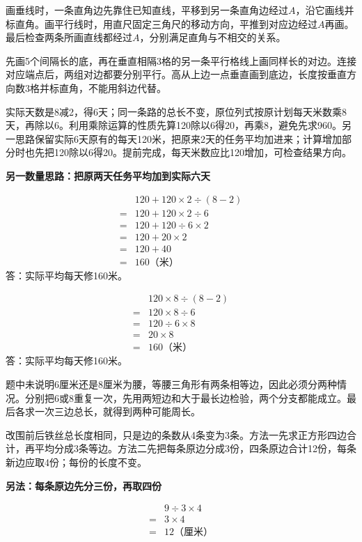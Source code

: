 \documentclass[multi=snippet,border=0pt]{standalone}
\newenvironment{snippet}[3]{\begin{minipage}{#1bp}\color{answerred}\fontsize{#2}{#3}\selectfont\raggedright}{\end{minipage}}
\begin{document}
\begin{snippet}{505}{11.5}{14}画垂线时，一条直角边先靠住已知直线，平移到另一条直角边经过\(A\)，沿它画线并标直角。画平行线时，用直尺固定三角尺的移动方向，平推到对应边经过\(A\)再画。最后检查两条所画直线都经过\(A\)，分别满足直角与不相交的关系。\end{snippet}
\begin{snippet}{505}{11.5}{14}先画5个间隔长的底，再在垂直相隔3格的另一条平行格线上画同样长的对边。连接对应端点后，两组对边都要分别平行。高从上边一点垂直画到底边，长度按垂直方向数3格并标直角，不能用斜边代替。\end{snippet}
\begin{snippet}{505}{11.5}{14}实际天数是8减2，得6天；同一条路的总长不变，原位列式按原计划每天米数乘8天，再除以6。利用乘除运算的性质先算120除以6得20，再乘8，避免先求960。另一思路保留实际6天原有的每天120米，把原来2天的任务平均加进来；计算增加部分时也先把120除以6得20。提前完成，每天米数应比120增加，可检查结果方向。\par \textbf{另一数量思路：把原两天任务平均加到实际六天}\par \[\begin{aligned}&120+120\times2\div(8-2)\\={}&120+120\times2\div6\\={}&120+120\div6\times2\\={}&120+20\times2\\={}&120+40\\={}&160\text{（米）}\end{aligned}\]答：实际平均每天修160米。\end{snippet}
\begin{snippet}{268}{10.5}{12.8}\[\begin{aligned}&120\times8\div(8-2)\\={}&120\times8\div6\\={}&120\div6\times8\\={}&20\times8\\={}&160\text{（米）}\end{aligned}\]答：实际平均每天修160米。\end{snippet}
\begin{snippet}{505}{11.5}{14}题中未说明6厘米还是8厘米为腰，等腰三角形有两条相等边，因此必须分两种情况。分别把6或8重复一次，先用两短边和大于最长边检验，两个分支都能成立。最后各求一次三边总长，就得到两种可能周长。\end{snippet}
\begin{snippet}{505}{11.5}{14}改围前后铁丝总长度相同，只是边的条数从4条变为3条。方法一先求正方形四边合计，再平均分成3条等边。方法二先把每条原边分成3份，四条原边合计12份，每条新边应取4份；每份的长度不变。\par \textbf{另法：每条原边先分三份，再取四份}\par \[\begin{aligned}&9\div3\times4\\={}&3\times4\\={}&12\text{（厘米）}\end{aligned}\]\end{snippet}
\end{document}
